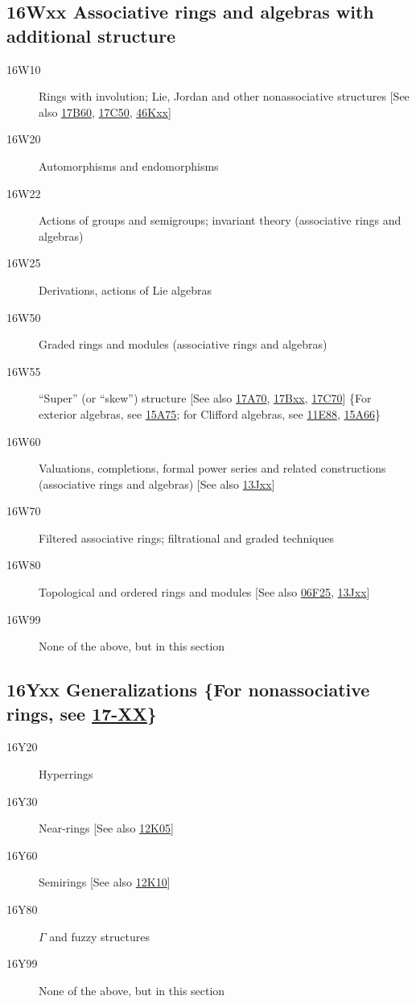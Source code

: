 \documentclass[letterpaper]{article}
\begin{document}
\subsection*{16Wxx  Associative rings and algebras with additional structure }\label{16Wxx}
\begin{description}  
\item [16W10]\label{16W10} Rings with involution; Lie, Jordan and other nonassociative structures [See also \hyperref[17B60]{17B60}, \hyperref[17C50]{17C50}, \hyperref[46Kxx]{46Kxx}]
\item [16W20]\label{16W20} Automorphisms and endomorphisms
\item [16W22]\label{16W22} Actions of groups and semigroups; invariant theory (associative rings and algebras)
\item [16W25]\label{16W25} Derivations, actions of Lie algebras
\item [16W50]\label{16W50} Graded rings and modules (associative rings and algebras)
\item [16W55]\label{16W55} ``Super'' (or ``skew'') structure [See also \hyperref[17A70]{17A70}, \hyperref[17Bxx]{17Bxx}, \hyperref[17C70]{17C70}] \{For exterior algebras, see \hyperref[15A75]{15A75}; for Clifford algebras, see \hyperref[11E88]{11E88}, \hyperref[15A66]{15A66}\}
\item [16W60]\label{16W60} Valuations, completions, formal power series and related constructions (associative rings and algebras) [See also \hyperref[13Jxx]{13Jxx}]
\item [16W70]\label{16W70} Filtered associative rings; filtrational and graded techniques
\item [16W80]\label{16W80} Topological and ordered rings and modules [See also \hyperref[06F25]{06F25}, \hyperref[13Jxx]{13Jxx}]
\item [16W99]\label{16W99} None of the above, but in this section
\end{description}
\subsection*{16Yxx  Generalizations \{For nonassociative rings, see \hyperref[17-XX]{17-XX}\} }\label{16Yxx}
\begin{description}  
\item [16Y20]\label{16Y20} Hyperrings
\item [16Y30]\label{16Y30} Near-rings  [See also \hyperref[12K05]{12K05}]
\item [16Y60]\label{16Y60} Semirings [See also \hyperref[12K10]{12K10}]
\item [16Y80]\label{16Y80} $\Gamma$ and fuzzy structures
\item [16Y99]\label{16Y99} None of the above, but in this section
\end{description}
\end{document}
